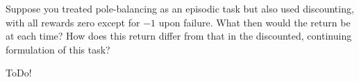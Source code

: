 
\begin{exercise}[Exercise 3.6]

Suppose you treated pole-balancing as an episodic task but also used discounting, with all rewards zero except for $-1$ upon failure.
What then would the return be at each time?
How does this return differ from that in the discounted, continuing formulation of this task?

\end{exercise}


\begin{solution}

ToDo!

\end{solution}

